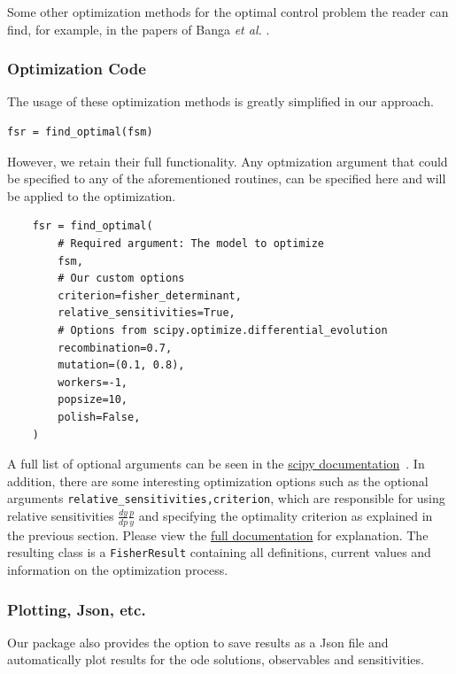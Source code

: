 \documentclass[10pt,A4paper]{article}
\newcommand{\etal}{{\textit{et al. }}}
\begin{document}
Some other optimization methods for the optimal control problem the reader can find, for example, in the papers of Banga \etal \cite{BANGA2005407, bangaImprovingFoodProcessing2003}.
%
\subsubsection*{Optimization Code}
The usage of these optimization methods is greatly simplified in our approach.
\begin{verbatim}
fsr = find_optimal(fsm)
\end{verbatim}
However, we retain their full functionality.
Any optmization argument that could be specified to any of the aforementioned routines, can be specified here and will be applied to the optimization.
\begin{verbatim}
    fsr = find_optimal(
        # Required argument: The model to optimize
        fsm,
        # Our custom options
        criterion=fisher_determinant,
        relative_sensitivities=True,
        # Options from scipy.optimize.differential_evolution
        recombination=0.7,
        mutation=(0.1, 0.8),
        workers=-1,
        popsize=10,
        polish=False,
    )
\end{verbatim}
A full list of optional arguments can be seen in the \href{https://docs.scipy.org/doc/scipy/reference/optimize.html#global-optimization}{scipy documentation}~\cite{virtanenSciPyFundamentalAlgorithms2020}.
In addition, there are some interesting optimization options such as the optional arguments \texttt{relative_sensitivities,criterion}, which are responsible for using relative sensitivities $\tfrac{dy}{dp}\tfrac{p}{y}$ and specifying the optimality criterion as explained in the previous section.
Please view the \href{https://spatial-systems-biology-freiburg.github.io/FisInMa/}{full documentation} for explanation.
The resulting class is a \texttt{FisherResult} containing all definitions, current values and information on the optimization process.
%
\subsubsection*{Plotting, Json, etc.}
Our package also provides the option to save results as a Json file and automatically plot results for the ode solutions, observables and sensitivities.
\end{document}
